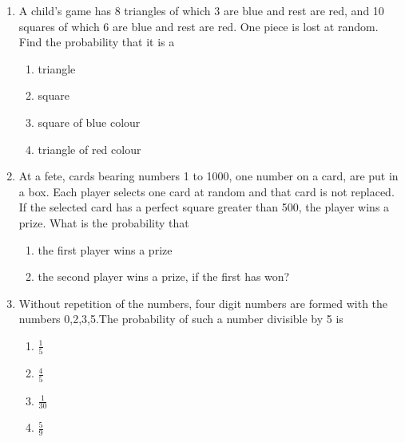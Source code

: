 \begin{enumerate}
\item A child's game has 8 triangles of which 3 are blue and rest are red, and 10 squares of which 6 are blue and rest are red. One piece is lost at random. Find the probability that it is a
\begin{enumerate}
\item triangle 
\item square 
\item square of blue colour 
\item triangle of red colour           
\end{enumerate}
\solution

\item At a fete, cards bearing numbers 1 to 1000, one number on a card, are put in a box. Each player selects one card at random and that card is not replaced. If the selected card has a perfect square greater than 500, the player wins a prize. What is the probability that 
\begin{enumerate}
\item the first player wins a prize
\item the second player wins a prize, if the first has won?
\end{enumerate}
\solution

\item Without repetition of the numbers, four digit numbers are formed with the numbers 0,2,3,5.The
probability of such a number divisible by 5 is
\begin{enumerate}
\item $\frac{1}{5}$ 
\item $\frac{4}{5}$
\item $\frac{1}{30}$ 
\item $\frac{5}{9}$
\end{enumerate}
\solution

\end{enumerate}
